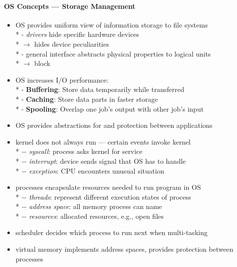 \paragraph{OS Concepts --- Storage Management}
\begin{itemize}
	\item OS provides uniform view of information storage to file systems \\*
		- \emph{drivers} hide specific hardware devices \\* \phantom{-} \( \to \) hides device peculiarities \\*
		- general interface abstracts physical properties to logical units \\* \phantom{-} \( \to \) block
	\item OS increases I/O performance: \\*
		- \textbf{Buffering}: Store data temporarily while transferred \\*
		- \textbf{Caching}: Store data parts in faster storage \\*
		- \textbf{Spooling}: Overlap one job's output with other job's input
\end{itemize}

\begin{summary}
	\begin{itemize}
		\item OS provides abstractions for and protection between applications
		\item kernel does not always run --- certain events invoke kernel \\*
			$ - $ \emph{syscall}: process asks kernel for service \\*
			$ - $ \emph{interrupt}: device sends signal that OS has to handle \\*
			$ - $ \emph{exception}: CPU encounters unusual situation
		\item processes encapsulate resources needed to run program in OS \\*
			$ - $ \emph{threads}: represent different execution states of process \\*
			$ - $ \emph{address space}: all memory process can name \\*
			$ - $ \emph{resources}: allocated resources, e.g., open files
		\item scheduler decides which process to run next when multi-tasking
		\item virtual memory implements address spaces, provides protection between processes
	\end{itemize}
\end{summary}